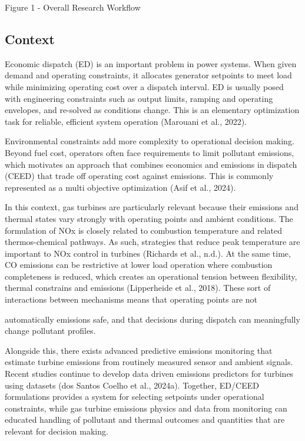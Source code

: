 \documentclass[11pt]{article}
\begin{document}
\protect{}\label{_Toc228132494}{}Figure 1 - Overall
Research Workflow

\subsection{Context}\label{context}

Economic dispatch (ED) is an important problem in power systems. When
given demand and operating constraints, it allocates generator setpoints
to meet load while minimizing operating cost over a dispatch interval.
ED is usually posed with engineering constraints such as output limits,
ramping and operating envelopes, and re-solved as conditions change.
This is an elementary optimization task for reliable, efficient system
operation (Marouani et al., 2022).

Environmental constraints add more complexity to operational decision
making. Beyond fuel cost, operators often face requirements to limit
pollutant emissions, which motivates an approach that combines economics
and emissions in dispatch (CEED) that trade off operating cost against
emissions. This is commonly represented as a multi objective
optimization (Asif et al., 2024).

In this context, gas turbines are particularly relevant because their
emissions and thermal states vary strongly with operating points and
ambient conditions. The formulation of NOx is closely related to
combustion temperature and related thermos-chemical pathways. As such,
strategies that reduce peak temperature are important to NOx control in
turbines (Richards et al., n.d.). At the same time, CO emissions can be
restrictive at lower load operation where combustion completeness is
reduced, which creates an operational tension between flexibility,
thermal constrains and emissions (Lipperheide et al., 2018). These sort
of interactions between mechanisms means that operating points are not

automatically emissions safe, and that decisions during dispatch can
meaningfully change pollutant profiles.

Alongside this, there exists advanced predictive emissions monitoring
that estimate turbine emissions from routinely measured sensor and
ambient signals. Recent studies continue to develop data driven
emissions predictors for turbines using datasets (dos Santos Coelho et
al., 2024a). Together, ED/CEED formulations provides a system for
selecting setpoints under operational constraints, while gas turbine
emissions physics and data from monitoring can educated handling of
pollutant and thermal outcomes and quantities that are relevant for
decision making.
\end{document}
